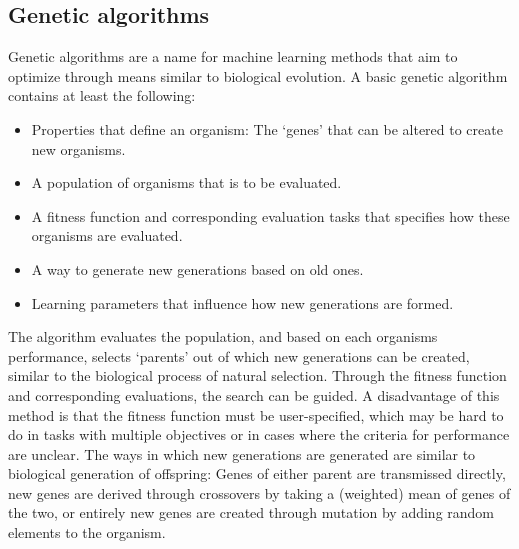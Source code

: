 \documentclass{article}
\begin{document}
\subsection{Genetic algorithms}
Genetic algorithms are a name for machine learning methods that aim to optimize through means similar to biological evolution. A basic genetic algorithm contains at least the following: \vspace{-2mm}

\begin{itemize} 
\setlength{\itemsep}{-1pt}
\item Properties that define an organism: The `genes' that can be altered to create new organisms.
\item A population of organisms that is to be evaluated.
\item A fitness function and corresponding evaluation tasks that specifies how these organisms are evaluated.
\item A way to generate new generations based on old ones. 
\item Learning parameters that influence how new generations are formed. 
\end{itemize}

The algorithm evaluates the population, and based on each organisms performance, selects `parents' out of which new generations can be created, similar to the biological process of natural selection. Through the fitness function and corresponding evaluations, the search can be guided. A disadvantage of this method is that the fitness function must be user-specified, which may be hard to do in tasks with multiple objectives or in cases where the criteria for performance are unclear. The ways in which new generations are generated are similar to biological generation of offspring: Genes of either parent are transmissed directly, new genes are derived through crossovers by taking a (weighted) mean of genes of the two, or entirely new genes are created through mutation by adding random elements to the organism.
\end{document}
